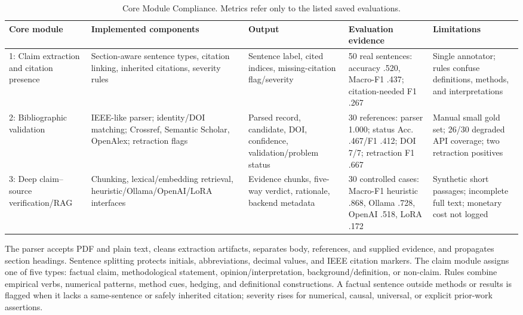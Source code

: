 \documentclass[12pt,toc=bib,toc=listof]{scrartcl}
\begin{document}
\begin{table}[H]
\centering
\scriptsize
\setlength{\tabcolsep}{3pt}
\begin{tabularx}{\textwidth}{@{}P{1.55cm}YYYY@{}}
\toprule
\textbf{Core module} & \textbf{Implemented components} & \textbf{Output} & \textbf{Evaluation evidence} & \textbf{Limitations} \\
: Claim extraction and citation presence & Section-aware sentence types, citation linking, inherited citations, severity rules & Sentence label, cited indices, missing-citation flag/severity & 50 real sentences: accuracy .520, Macro-F1 .437; citation-needed F1 .267 & Single annotator; rules confuse definitions, methods, and interpretations \\
2: Bibliographic validation & IEEE-like parser; identity/DOI matching; Crossref, Semantic Scholar, OpenAlex; retraction flags & Parsed record, candidate, DOI, confidence, validation/problem status & 30 references: parser 1.000; status Acc. .467/F1 .412; DOI 7/7; retraction F1 .667 & Manual small gold set; 26/30 degraded API coverage; two retraction positives \\
3: Deep claim--source verification/RAG & Chunking, lexical/embedding retrieval, heuristic/Ollama/OpenAI/LoRA interfaces & Evidence chunks, five-way verdict, rationale, backend metadata & 30 controlled cases: Macro-F1 heuristic .868, Ollama .728, OpenAI .518, LoRA .172 & Synthetic short passages; incomplete full text; monetary cost not logged \\
\bottomrule
\end{tabularx}
\caption{Core Module Compliance. Metrics refer only to the listed saved evaluations.}
\label{tab:compliance}
\end{table}

The parser accepts PDF and plain text, cleans extraction artifacts, separates body, references, and supplied evidence, and propagates section headings. Sentence splitting protects initials, abbreviations, decimal values, and IEEE citation markers. The claim module assigns one of five types: factual claim, methodological statement, opinion/interpretation, background/definition, or non-claim. Rules combine empirical verbs, numerical patterns, method cues, hedging, and definitional constructions. A factual sentence outside methods or results is flagged when it lacks a same-sentence or safely inherited citation; severity rises for numerical, causal, universal, or explicit prior-work assertions.
\end{document}
